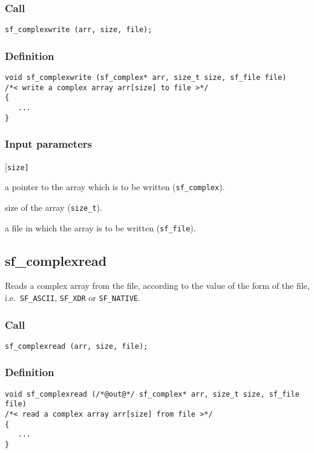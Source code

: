 \subsubsection*{Call}
\begin{verbatim}sf_complexwrite (arr, size, file);\end{verbatim}

\subsubsection*{Definition}
\begin{verbatim}
void sf_complexwrite (sf_complex* arr, size_t size, sf_file file)
/*< write a complex array arr[size] to file >*/
{
   ...
}
\end{verbatim}

\subsubsection*{Input parameters}
\begin{desclist}{\tt }{\quad}[\tt size]
   \setlength\itemsep{0pt}
   \item[arr] a pointer to the array which is to be written (\texttt{sf\_complex}). 
   \item[size] size of the array (\texttt{size\_t}). 
   \item[file] a file in which the array is to be written (\texttt{sf\_file}).
\end{desclist}




\subsection{{sf\_complexread}}
Reads a complex array from the file, according to the value of the form of the file, i.e.~\texttt{SF\_ASCII}, \texttt{SF\_XDR} or \texttt{SF\_NATIVE}.    

\subsubsection*{Call}
\begin{verbatim}sf_complexread (arr, size, file);\end{verbatim}

\subsubsection*{Definition}
\begin{verbatim}
void sf_complexread (/*@out@*/ sf_complex* arr, size_t size, sf_file file)
/*< read a complex array arr[size] from file >*/
{
   ...
}
\end{verbatim}

